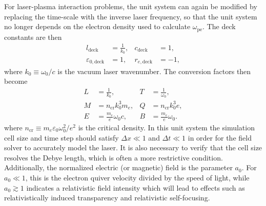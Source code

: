 \documentclass[twocolumn,10pt]{article}
\newcommand{\ncrit}{n_{\mathrm{cr}}}
\begin{document}
	For laser-plasma interaction problems, the unit system can again be modified by replacing the time-scale with the inverse laser frequency, so that the unit system no longer depends on the electron density used to calculate $\omega_{\mathrm{pe}}$. The deck constants are then
	\begin{align*}
		l_{\mathrm{deck}} &= \frac{1}{k_0}, &
		c_{\mathrm{deck}} &= 1, \\
		\varepsilon_{0,\mathrm{deck}} &= 1, &
		r_{e,\mathrm{deck}} &= -1,
	\end{align*}
	where $k_0 \equiv \omega_0/c$ is the vacuum laser wavenumber. The conversion factors then become
	\begin{align*}
		L &= \frac{1}{k_0}, &
		T &= \frac{1}{\omega_0}, \\
		M &= \ncrit k_0^3m_e, &
		Q &= \ncrit k_0^3e, \\
		E &= \frac{m_e}{e}\omega_0 c, &
		B &= \frac{m_e}{e}\omega_0.
	\end{align*}
	where $\ncrit \equiv m_e\varepsilon_0\omega_0^2/e^2$ is the critical density.  In this unit system the simulation cell size and time step should satisfy $\Delta x \ll 1$ and $\Delta t \ll 1$ in order for the field solver to accurately model the laser. It is also necessary to verify that the cell size resolves the Debye length, which is often a more restrictive condition. Additionally, the normalized electric (or magnetic) field is the parameter $a_0$. For $a_0 \ll 1$, this is the electron quiver velocity divided by the speed of light, while $a_0 \gtrsim 1$ indicates a relativistic field intensity which will lead to effects such as relativistically induced transparency and relativistic self-focusing.
\end{document}
